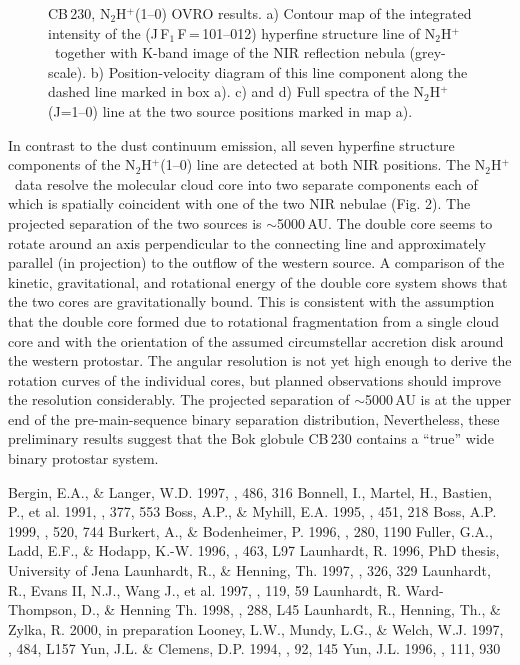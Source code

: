 \begin{figure} 
\caption{CB\,230, N$_2$H$^+$(1--0) OVRO results. 
a) Contour map of the integrated intensity of the 
(J\,F$_1$\,F\,=\,101--012) hyperfine structure line of N$_2$H$^+$\ together with 
K-band image of the NIR reflection nebula (grey-scale).
b) Position-velocity diagram of this line component 
along the dashed line marked in box a). 
c) and d) Full spectra of the N$_2$H$^+$(J=1--0) line 
at the two source positions marked in map a).}
\end{figure}

In contrast to the dust continuum emission, all seven hyperfine structure 
components of the N$_2$H$^+$(1--0) line are detected at both NIR positions. 
The N$_2$H$^+$\ data resolve the molecular cloud 
core into two separate components each of which is spatially coincident 
with one of the two NIR nebulae (Fig. 2). 
The projected separation of the two sources is $\sim$5000\,AU. 
The double core seems to rotate around an axis perpendicular to the connecting line 
and approximately parallel (in projection) to the outflow of the western source. 
A comparison of the kinetic, gravitational, and rotational energy of the double core 
system shows that the two cores are gravitationally bound. 
This is consistent with the assumption that the double core formed due to 
rotational fragmentation from a single cloud core and with the orientation 
of the assumed circumstellar accretion disk around the western protostar.
The angular resolution is not yet high enough to 
derive the rotation curves of the individual cores, but planned observations 
should improve the resolution considerably.
The projected separation of $\sim$5000\,AU is at  
the upper end of the pre-main-sequence binary separation distribution, 
Nevertheless, these preliminary results suggest that the Bok globule CB\,230 contains a ``true'' 
wide binary protostar system.

\begin{references}

 Bergin, E.A., \& Langer, W.D. 1997, \apj, 486, 316
 Bonnell, I., Martel, H., Bastien, P., et al. 1991, \apj, 377, 553
 Boss, A.P., \& Myhill, E.A. 1995, \apj, 451, 218
 Boss, A.P. 1999, \apj, 520, 744
 Burkert, A., \& Bodenheimer, P. 1996, \mnras, 280, 1190
 Fuller, G.A., Ladd, E.F., \& Hodapp, K.-W. 1996, \apj, 463, L97
 Launhardt, R. 1996, PhD thesis, University of Jena
 Launhardt, R., \& Henning, Th. 1997, \aap, 326, 329 
 Launhardt, R., Evans II, N.J., Wang J., et al. 1997, \apjs, 119, 59
 Launhardt, R. Ward-Thompson, D., \& Henning Th. 1998, \mnras, 288, L45
 Launhardt, R., Henning, Th., \& Zylka, R. 2000, in preparation
 Looney, L.W., Mundy, L.G., \& Welch, W.J. 1997, \apj, 484, L157
 Yun, J.L. \& Clemens, D.P. 1994, \apjs, 92, 145
 Yun, J.L. 1996, \aj, 111, 930

\end{references}



